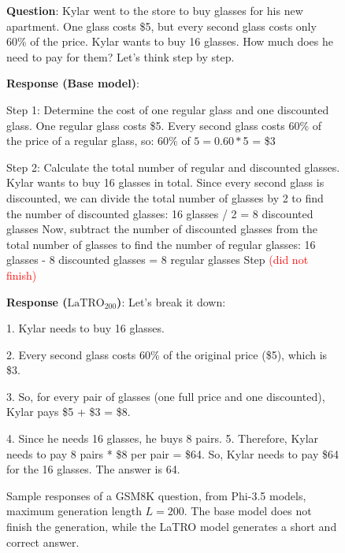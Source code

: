 \begin{figure}[ht]
    \centering
    \begin{bluetextbox}
        \textbf{Question}: Kylar went to the store to buy glasses for his new apartment. One glass costs \$5, but every second glass costs only 60\% of the price. Kylar wants to buy 16 glasses. How much does he need to pay for them? Let's think step by step.

        \textbf{Response (Base model)}:
        
        Step 1: Determine the cost of one regular glass and one discounted glass. One regular glass costs \$5. Every second glass costs 60\% of the price of a regular glass, so: 60\% of $5 = 0.60 * $5 = \$3
        
        Step 2: Calculate the total number of regular and discounted glasses. Kylar wants to buy 16 glasses in total. Since every second glass is discounted, we can divide the total number of glasses by 2 to find the number of discounted glasses: 16 glasses / 2 = 8 discounted glasses Now, subtract the number of discounted glasses from the total number of glasses to find the number of regular glasses: 16 glasses - 8 discounted glasses = 8 regular glasses Step \textcolor{red}{(did not finish)}

        \textbf{Response ($\text{LaTRO}_{200}$)}: Let's break it down:
        
        1. Kylar needs to buy 16 glasses.
        
        2. Every second glass costs 60\% of the original price (\$5), which is \$3.
        
        3. So, for every pair of glasses (one full price and one discounted), Kylar pays \$5 + \$3 = \$8.
        
        4. Since he needs 16 glasses, he buys 8 pairs. 5. Therefore, Kylar needs to pay 8 pairs * \$8 per pair = \$64. So, Kylar needs to pay \$64 for the 16 glasses. The answer is 64.

    \end{bluetextbox}
    
    \caption{Sample responses of a GSM8K question, from Phi-3.5 models, maximum generation length $L=200$. The base model does not finish the generation, while the LaTRO model generates a short and correct answer.}
    \label{fig:sample_latro_200_phi}
\end{figure}


